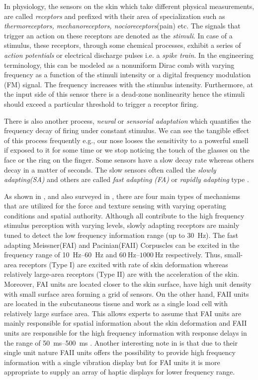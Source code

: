 In physiology, the sensors on the skin which take different physical measurements, are called \emph{receptors} and prefixed with their area of specialization such as \emph{thermoreceptors, mechanoreceptors, nocioreceptors}(pain) etc. The signals that trigger an action on these receptors are denoted as the \emph{stimuli}. In case of a stimulus, these receptors, through some chemical processes, exhibit a series of \emph{action potentials} or electrical discharge pulses i.e. a \emph{spike train}. In the engineering terminology, this can be modeled as a nonuniform Dirac comb with varying frequency as a function of the stimuli intensity or a digital frequency modulation (FM) signal. The frequency increases with the stimulus intensity. Furthermore, at the input side of this sensor there is a dead-zone nonlinearity hence the stimuli should exceed a particular threshold to trigger a receptor firing.

There is also another process, \emph{neural} or \emph{sensorial adaptation} which quantifies the frequency decay of firing under constant stimulus. We can see the tangible effect of this process frequently e.g., our nose looses the sensitivity to a powerful smell if exposed to it for some time or we stop noticing the touch of the glasses on the face or the ring on the finger. Some sensors have a slow decay rate whereas others decay in a matter of seconds. The slow sensors often called the \emph{slowly adapting(SA)} and others are called \emph{fast adapting (FA)} or \emph{rapidly adapting} type \cite{burdea}.


As shown in , and also surveyed in \cite{kontarinis}, there are four main types of mechanisms that are utilized for the force and texture sensing with varying operating conditions and spatial authority. Although all contribute to the high frequency stimulus perception with varying levels, slowly adapting receptors are mainly tuned to detect the low frequency information range (up to \SI{30}{\hertz}). The fast adapting Meissner(FAI) and Pacinian(FAII) Corpuscles can be excited in the frequency range of \SIrange{10}{60}{\hertz} and $\SIrange{60}{1000}{\hertz}$ respectively. Thus, small-area receptors (Type I) are excited with rate of skin deformation whereas relatively large-area receptors (Type II) are with the acceleration of the skin. Moreover, FAI units are located closer to the skin surface, have high unit density with small surface area forming a grid of sensors. On the other hand, FAII units are located in the subcutaneous tissue and work as a single load cell with relatively large surface area. This allows experts to assume that FAI units are mainly responsible for spatial information about the skin deformation and FAII units are responsible for the high frequency information with response delays in the range of \SIrange{50}{500}{\milli\second} \cite{idareview}. Another interesting note in \cite{kontarinis} is that due to their single unit nature FAII units offers the possibility to provide high frequency information with a single vibration display but for FAI units it is more appropriate to supply an array of haptic displays for lower frequency range.  

